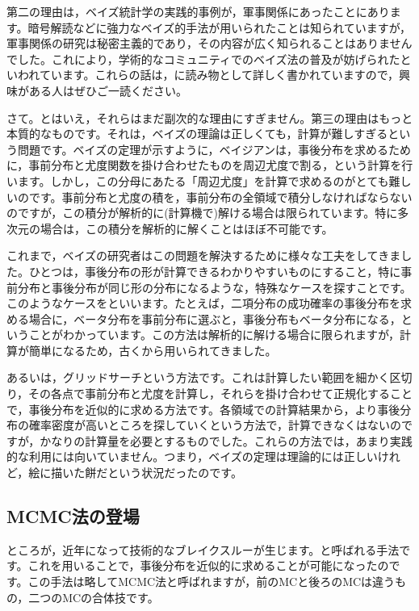 \documentclass{ltjbook}
\begin{document}
第二の理由は，ベイズ統計学の実践的事例が，軍事関係にあったことにあります。暗号解読などに強力なベイズ的手法が用いられたことは知られていますが，軍事関係の研究は秘密主義的であり，その内容が広く知られることはありませんでした。これにより，学術的なコミュニティでのベイズ法の普及が妨げられたといわれています。これらの話は，\textcite{mcgrayne2011theory}に読み物として詳しく書かれていますので，興味がある人はぜひご一読ください。

さて。とはいえ，それらはまだ副次的な理由にすぎません。第三の理由はもっと本質的なものです。それは，ベイズの理論は正しくても，計算が難しすぎるという問題です。ベイズの定理が示すように，ベイジアンは，事後分布を求めるために，事前分布と尤度関数を掛け合わせたものを周辺尤度で割る，という計算を行います。しかし，この分母にあたる「周辺尤度」を計算で求めるのがとても難しいのです。事前分布と尤度の積を，事前分布の全領域で積分しなければならないのですが，この積分が解析的に(計算機で)解ける場合は限られています。特に多次元の場合は，この積分を解析的に解くことはほぼ不可能です。

これまで，ベイズの研究者はこの問題を解決するために様々な工夫をしてきました。ひとつは，事後分布の形が計算できるわかりやすいものにすること，特に事前分布と事後分布が同じ形の分布になるような，特殊なケースを探すことです。このようなケースをといいます。たとえば，二項分布の成功確率の事後分布を求める場合に，ベータ分布を事前分布に選ぶと，事後分布もベータ分布になる，ということがわかっています。この方法は解析的に解ける場合に限られますが，計算が簡単になるため，古くから用いられてきました。

あるいは，グリッドサーチという方法です。これは計算したい範囲を細かく区切り，その各点で事前分布と尤度を計算し，それらを掛け合わせて正規化することで，事後分布を近似的に求める方法です。各領域での計算結果から，より事後分布の確率密度が高いところを探していくという方法で，計算できなくはないのですが，かなりの計算量を必要とするものでした。これらの方法では，あまり実践的な利用には向いていません。つまり，ベイズの定理は理論的には正しいけれど，絵に描いた餅だという状況だったのです。

\subsection{MCMC法の登場}

ところが，近年になって技術的なブレイクスルーが生じます。と呼ばれる手法です。これを用いることで，事後分布を近似的に求めることが可能になったのです。この手法は略してMCMC法と呼ばれますが，前のMCと後ろのMCは違うもの，二つのMCの合体技です。
\end{document}
